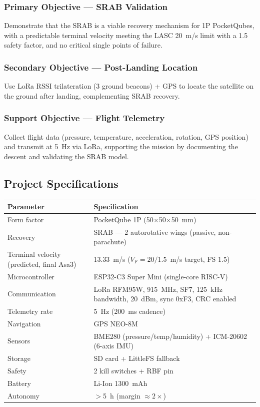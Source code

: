 \subsubsection{Primary Objective — SRAB Validation}

Demonstrate that the SRAB is a viable recovery mechanism for 1P
PocketQubes, with a predictable terminal velocity meeting the LASC
20~m/s limit with a 1.5 safety factor, and no critical single points
of failure.

\subsubsection{Secondary Objective — Post-Landing Location}

Use LoRa RSSI trilateration (3 ground beacons) + GPS to locate the
satellite on the ground after landing, complementing SRAB recovery.

\subsubsection{Support Objective — Flight Telemetry}

Collect flight data (pressure, temperature, acceleration, rotation,
GPS position) and transmit at 5~Hz via LoRa, supporting the mission by
documenting the descent and validating the SRAB model.

\subsection{Project Specifications}

\begin{center}
{\small
\setlength{\tabcolsep}{6pt}
\begin{tabularx}{\linewidth}{>{\raggedright}p{5.2cm}X}
\toprule
\textbf{Parameter} & \textbf{Specification} \\
\midrule
Form factor & PocketQube 1P (50$\times$50$\times$50~mm) \\
Recovery & SRAB --- 2 autorotative wings (passive, non-parachute) \\
Terminal velocity (predicted, final Asa3) & 13.33~m/s ($V_F = 20/1.5$~m/s target, FS 1.5) \\
Microcontroller & ESP32-C3 Super Mini (single-core RISC-V) \\
Communication & LoRa RFM95W, 915~MHz, SF7, 125~kHz bandwidth, 20~dBm, sync 0xF3, CRC enabled \\
Telemetry rate & 5~Hz (200~ms cadence) \\
Navigation & GPS NEO-8M \\
Sensors & BME280 (pressure/temp/humidity) + ICM-20602 (6-axis IMU) \\
Storage & SD card + LittleFS fallback \\
Safety & 2 kill switches + RBF pin \\
Battery & Li-Ion 1300~mAh \\
Autonomy & $>$5~h (margin $\approx 2\times$) \\
\bottomrule
\end{tabularx}
}
\end{center}
